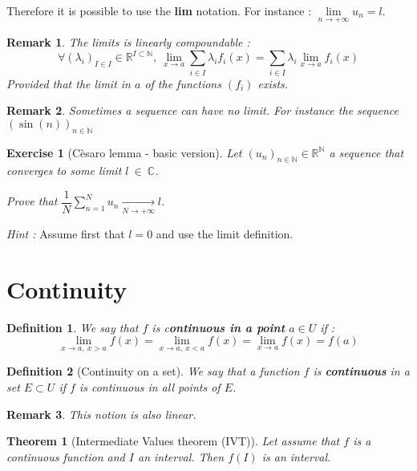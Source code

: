 \documentclass[french,12pt,a4paper]{book}
\newcommand{\N}{\mathbb{N}}
\newcommand{\R}{\mathbb{R}}
\newcommand{\C}{\mathbb{C}}
\newtheorem{theo}{Theorem}[chapter]
\newtheorem{exo}{Exercise}[chapter]
\newtheorem{defin}{Definition}[chapter]
\newtheorem{rem}{Remark}[chapter]
\numberwithin{equation}{chapter}
\begin{document}
Therefore it is possible to use the \textbf{lim} notation. For instance : $\lim \limits_{n \rightarrow + \infty} u_n = l$.

\begin{rem}
The limits is linearly compoundable :
$$\forall (\lambda_i)_{I \in I} \in \R^{I \subset \N}, \ \lim \limits_{x \rightarrow a} \sum_{i \in I} \lambda_i f_i(x) = \sum_{i \in I} \lambda_i \lim \limits_{x \rightarrow a}  f_i(x)$$
Provided that the limit in $a$ of the functions $(f_i)$ exists. 
\end{rem}

\begin{rem}
Sometimes a sequence can have no limit. For instance the sequence $(\sin (n))_{n \in \N}$
\end{rem}

\begin{exo}[Cèsaro lemma - basic version]
Let $(u_n)_{n \in \N} \in \R^\N$ a sequence that converges to some limit $l~\in~\C$.

Prove that $\dfrac{1}{N} \sum \limits_{n=1}^N u_n \underset{N \rightarrow + \infty} \rightarrow l$.
\end{exo}
\emph{Hint :} Assume first that $l = 0$ and use the limit definition.


\section{Continuity}

\begin{defin}
We say that $f$ is c\textbf{ontinuous in a point} $a \in U$ if :
$$\lim \limits_{x \rightarrow a, \ x > a} f(x) = \lim \limits_{x \rightarrow a, \  x < a} f(x)  = \lim \limits_{x \rightarrow a } f(x) = f(a)$$
\end{defin}

\begin{defin}[Continuity on a set]
We say that a function $f$ is \textbf{continuous} in a set $E \subset U$ if $f$ is continuous in all points of $E$. 
\end{defin}

\begin{rem}
This notion is also linear. 
\end{rem}

\begin{theo}[Intermediate Values theorem (IVT)]
Let assume that $f$ is a continuous function and $I$ an interval. Then $f(I)$ is an interval. 
\end{theo}
\end{document}
